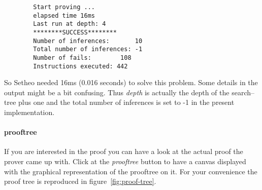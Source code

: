 \begin{verbatim}
        Start proving ...
        elapsed time 16ms
        Last run at depth: 4
        ********SUCCESS********
        Number of inferences:		10
        Total number of inferences:	-1
        Number of fails:		108
        Instructions executed: 442
\end{verbatim}

So Setheo needed 16ms (0.016 seconds) to solve this problem. Some details in the output might be a
bit confusing. Thus {\it depth\/} is actually the depth of the search--tree plus one and the total number of
inferences is set to -1 in the present implementation.
\paragraph{prooftree}
If you are interested in the proof you can have a look at the actual proof the prover came up with.
Click at the {\it prooftree\/} button to have a canvas displayed with the graphical representation of the
prooftree on it.
For your convenience the proof tree is reproduced in figure~\ref{fig:proof-tree}.
%


